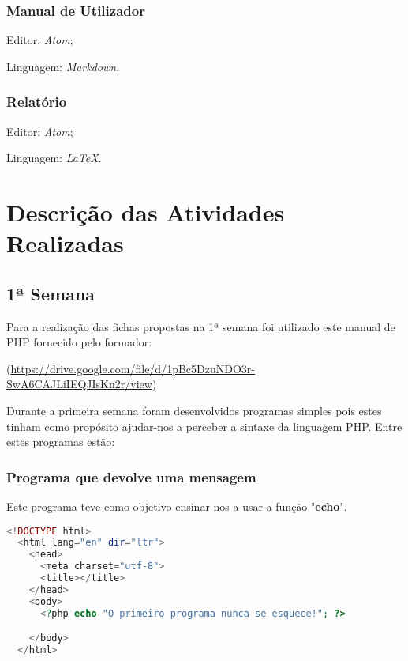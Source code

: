 \documentclass[14pt]{article}
\begin{document}
\subsubsection{Manual de Utilizador}
\begin{list}{•}
  \item Editor: \textit{Atom};
  \item
  \item Linguagem: \textit{Markdown}.
\end{list}


\subsubsection{Relatório}
\begin{list}{•}
\item Editor: \textit{Atom};
\item
\item Linguagem: \textit{LaTeX}.

\end{list}

\section{Descrição das Atividades Realizadas}
\subsection{1ª Semana}
Para a realização das fichas propostas na 1ª semana foi utilizado este manual de PHP fornecido pelo formador:

(\url{https://drive.google.com/file/d/1pBc5DzuNDO3r-SwA6CAJLiIEQJIsKn2r/view})

Durante a primeira semana foram desenvolvidos programas simples pois estes tinham como propósito ajudar-nos a perceber a sintaxe da linguagem PHP.
Entre estes programas estão:
\subsubsection{Programa que devolve uma mensagem}
Este programa teve como objetivo ensinar-nos a usar a função "\textbf{echo}".
\begin{lstlisting}[language=PHP]
  <!DOCTYPE html>
  <html lang="en" dir="ltr">
    <head>
      <meta charset="utf-8">
      <title></title>
    </head>
    <body>
      <?php echo "O primeiro programa nunca se esquece!"; ?>

    </body>
  </html>

\end{lstlisting}
\end{document}
